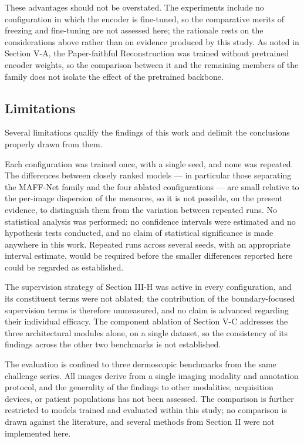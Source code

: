 These advantages should not be overstated. The experiments include no configuration in which the encoder is fine-tuned, so the comparative merits of freezing and fine-tuning are not assessed here; the rationale rests on the considerations above rather than on evidence produced by this study. As noted in Section V-A, the Paper-faithful Reconstruction was trained without pretrained encoder weights, so the comparison between it and the remaining members of the family does not isolate the effect of the pretrained backbone.

\subsection{Limitations}

Several limitations qualify the findings of this work and delimit the conclusions properly drawn from them.

Each configuration was trained once, with a single seed, and none was repeated. The differences between closely ranked models --- in particular those separating the MAFF-Net family and the four ablated configurations --- are small relative to the per-image dispersion of the measures, so it is not possible, on the present evidence, to distinguish them from the variation between repeated runs. No statistical analysis was performed: no confidence intervals were estimated and no hypothesis tests conducted, and no claim of statistical significance is made anywhere in this work. Repeated runs across several seeds, with an appropriate interval estimate, would be required before the smaller differences reported here could be regarded as established.

The supervision strategy of Section III-H was active in every configuration, and its constituent terms were not ablated; the contribution of the boundary-focused supervision terms is therefore unmeasured, and no claim is advanced regarding their individual efficacy. The component ablation of Section V-C addresses the three architectural modules alone, on a single dataset, so the consistency of its findings across the other two benchmarks is not established.

The evaluation is confined to three dermoscopic benchmarks from the same challenge series. All images derive from a single imaging modality and annotation protocol, and the generality of the findings to other modalities, acquisition devices, or patient populations has not been assessed. The comparison is further restricted to models trained and evaluated within this study; no comparison is drawn against the literature, and several methods from Section II were not implemented here.


